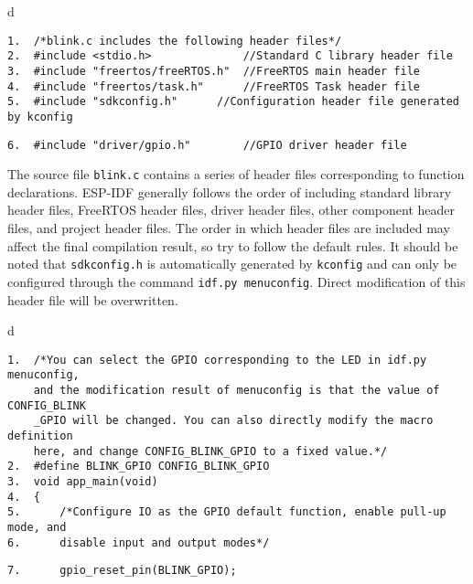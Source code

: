 \documentclass[a4paper,12pt]{book}
\begin{document}
\begin{codebloc}
\begin{tabular}{d}
\vspace{2pt}
\begin{verbatim}
1.  /*blink.c includes the following header files*/
2.  #include <stdio.h>              //Standard C library header file
3.  #include "freertos/freeRTOS.h"  //FreeRTOS main header file
4.  #include "freertos/task.h"      //FreeRTOS Task header file
5.  #include "sdkconfig.h"      //Configuration header file generated by kconfig
\end{verbatim}
\verb|6.  #include "driver/gpio.h"        //GPIO driver header file|
\end{tabular}
\end{codebloc}

The source file \verb|blink.c| contains a series of header files corresponding to function declarations. ESP-IDF generally follows the order of including standard library header files, FreeRTOS header files, driver header files, other component header files, and project header files. The order in which header files are included may affect the final compilation result, so try to follow the default rules. It should be noted that \verb|sdkconfig.h| is automatically generated by \verb|kconfig| and can only be configured through the command \verb|idf.py menuconfig|. Direct modification of this header file will be overwritten.

\begin{codebloc}
\begin{tabular}{d}
\vspace{2pt}
\begin{verbatim}
1.  /*You can select the GPIO corresponding to the LED in idf.py menuconfig,
    and the modification result of menuconfig is that the value of CONFIG_BLINK
    _GPIO will be changed. You can also directly modify the macro definition 
    here, and change CONFIG_BLINK_GPIO to a fixed value.*/
2.  #define BLINK_GPIO CONFIG_BLINK_GPIO
3.  void app_main(void)
4.  {
5.      /*Configure IO as the GPIO default function, enable pull-up mode, and
6.      disable input and output modes*/
\end{verbatim}
\verb|7.      gpio_reset_pin(BLINK_GPIO);|
\end{tabular}
\end{codebloc}
\end{document}
